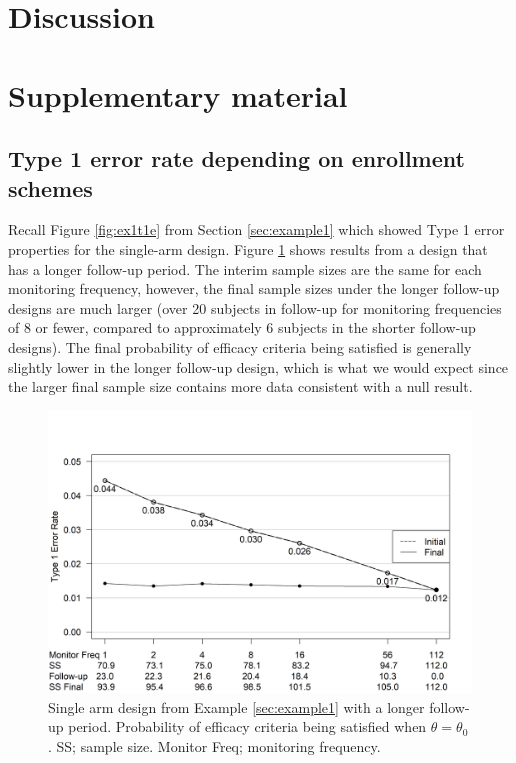 \documentclass[12pt]{article}
\begin{document}
\section{Discussion}

\section{Supplementary material}


\subsection{Type 1 error rate depending on enrollment schemes}
Recall Figure \ref{fig:ex1t1e} from Section \ref{sec:example1} which showed Type 1 error properties for the single-arm design. Figure \ref{fig:ex1t1e_longer} shows results from a design that has a longer follow-up period. The interim sample sizes are the same for each monitoring frequency, however, the final sample sizes under the longer follow-up designs are much larger (over 20 subjects in follow-up for monitoring frequencies of 8 or fewer, compared to approximately 6 subjects in the shorter follow-up designs). The final probability of efficacy criteria being satisfied is generally slightly lower in the longer follow-up design, which is what we would expect since the larger final sample size contains more data consistent with a null result.
\begin{figure}\begin{center}

   \includegraphics[width=6in]{./FIGURES/figureS1.png}
    \caption{Single arm design from Example \ref{sec:example1} with a longer follow-up period. Probability of efficacy criteria being satisfied when $\theta=\theta_0$. SS; sample size. Monitor Freq; monitoring frequency.}
	\label{fig:ex1t1e_longer}

\end{center}\end{figure}
\end{document}
